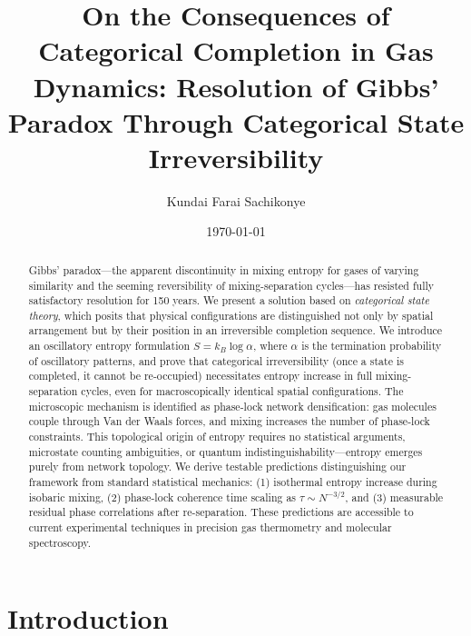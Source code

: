 \documentclass[twocolumn,superscriptaddress,prb,10pt]{revtex4-2}
\theoremstyle{definition}
\theoremstyle{remark}
\begin{document}
\title{On the Consequences of Categorical Completion in Gas Dynamics: Resolution of Gibbs' Paradox Through Categorical State Irreversibility}

\author{Kundai Farai Sachikonye}

\date{\today}

\begin{abstract}
Gibbs' paradox—the apparent discontinuity in mixing entropy for gases of varying similarity and the seeming reversibility of mixing-separation cycles—has resisted fully satisfactory resolution for 150 years. We present a solution based on \emph{categorical state theory}, which posits that physical configurations are distinguished not only by spatial arrangement but by their position in an irreversible completion sequence. We introduce an oscillatory entropy formulation $S = k_B \log \alpha$, where $\alpha$ is the termination probability of oscillatory patterns, and prove that categorical irreversibility (once a state is completed, it cannot be re-occupied) necessitates entropy increase in full mixing-separation cycles, even for macroscopically identical spatial configurations. The microscopic mechanism is identified as phase-lock network densification: gas molecules couple through Van der Waals forces, and mixing increases the number of phase-lock constraints. This topological origin of entropy requires no statistical arguments, microstate counting ambiguities, or quantum indistinguishability—entropy emerges purely from network topology. We derive testable predictions distinguishing our framework from standard statistical mechanics: (1) isothermal entropy increase during isobaric mixing, (2) phase-lock coherence time scaling as $\tau \sim N^{-3/2}$, and (3) measurable residual phase correlations after re-separation. These predictions are accessible to current experimental techniques in precision gas thermometry and molecular spectroscopy.
\end{abstract}


\maketitle

\section{Introduction}
\end{document}
